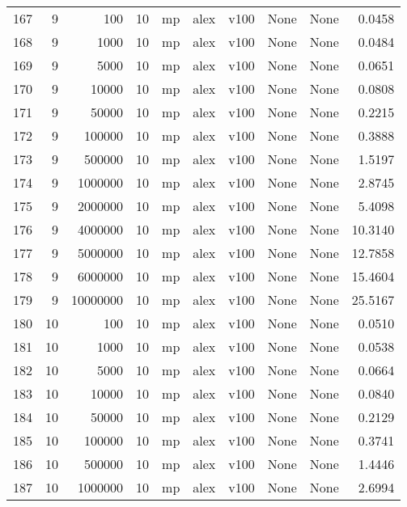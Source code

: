 \begin{tabular}{lrrrlllllr}
167 &   9 &       100 &      10 &   mp &  alex &  v100 &  None &  None &   0.0458 \\
168 &   9 &      1000 &      10 &   mp &  alex &  v100 &  None &  None &   0.0484 \\
169 &   9 &      5000 &      10 &   mp &  alex &  v100 &  None &  None &   0.0651 \\
170 &   9 &     10000 &      10 &   mp &  alex &  v100 &  None &  None &   0.0808 \\
171 &   9 &     50000 &      10 &   mp &  alex &  v100 &  None &  None &   0.2215 \\
172 &   9 &    100000 &      10 &   mp &  alex &  v100 &  None &  None &   0.3888 \\
173 &   9 &    500000 &      10 &   mp &  alex &  v100 &  None &  None &   1.5197 \\
174 &   9 &   1000000 &      10 &   mp &  alex &  v100 &  None &  None &   2.8745 \\
175 &   9 &   2000000 &      10 &   mp &  alex &  v100 &  None &  None &   5.4098 \\
176 &   9 &   4000000 &      10 &   mp &  alex &  v100 &  None &  None &  10.3140 \\
177 &   9 &   5000000 &      10 &   mp &  alex &  v100 &  None &  None &  12.7858 \\
178 &   9 &   6000000 &      10 &   mp &  alex &  v100 &  None &  None &  15.4604 \\
179 &   9 &  10000000 &      10 &   mp &  alex &  v100 &  None &  None &  25.5167 \\
180 &  10 &       100 &      10 &   mp &  alex &  v100 &  None &  None &   0.0510 \\
181 &  10 &      1000 &      10 &   mp &  alex &  v100 &  None &  None &   0.0538 \\
182 &  10 &      5000 &      10 &   mp &  alex &  v100 &  None &  None &   0.0664 \\
183 &  10 &     10000 &      10 &   mp &  alex &  v100 &  None &  None &   0.0840 \\
184 &  10 &     50000 &      10 &   mp &  alex &  v100 &  None &  None &   0.2129 \\
185 &  10 &    100000 &      10 &   mp &  alex &  v100 &  None &  None &   0.3741 \\
186 &  10 &    500000 &      10 &   mp &  alex &  v100 &  None &  None &   1.4446 \\
187 &  10 &   1000000 &      10 &   mp &  alex &  v100 &  None &  None &   2.6994 \\

\end{tabular}
